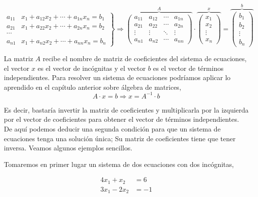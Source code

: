 \begin{equation*}
\left. \begin{aligned}
a_{11}&x_1+a_{12}x_2+\cdots +a_{1n}x_n=b_1\\
a_{21}&x_1+a_{22}x_2+\cdots +a_{2n}x_n=b_2\\
\cdots & \\
a_{n1}&x_1+a_{n2}x_2+\cdots +a_{nn}x_n=b_n
\end{aligned}\right\} \Rightarrow	\overbrace{\begin{pmatrix}
a_{11}& a_{12}& \cdots & a_{1n}\\
a_{21}& a_{22}& \cdots & a_{2n}\\
\vdots & \vdots & \ddots & \vdots\\
a_{n1}& a_{n2}& \cdots & a_{nn}
\end{pmatrix}}^A \cdot \overbrace{\begin{pmatrix}
x_1\\
x_2\\
\vdots \\
x_n
\end{pmatrix}}^x=\overbrace{\begin{pmatrix}
b_1\\
b_2\\
\vdots \\
b_n
\end{pmatrix}}^b
\end{equation*}

La matriz $A$ recibe el nombre de matriz de coeficientes del sistema de ecuaciones, el vector $x$ es el vector de incógnitas y el vector $b$ es el vector de términos independientes. Para resolver un sistema de ecuaciones podríamos aplicar lo aprendido en el capítulo anterior sobre álgebra de matrices,
\begin{equation*}
A\cdot x=b \Rightarrow x=A^{-1}\cdot b
\end{equation*}

Es decir, bastaría invertir la matriz de coeficientes y multiplicarla por la izquierda por el vector de coeficientes para obtener el vector de  términos independientes. De aquí podemos deducir una segunda condición para que un sistema de ecuaciones tenga una solución única; Su matriz de coeficientes tiene que tener inversa. Veamos algunos ejemplos sencillos.

Tomaremos en primer lugar un sistema de dos ecuaciones con dos incógnitas,

\begin{align*}
4x_1+x_2&=6\\
3x_1-2x_2&=-1
\end{align*}

